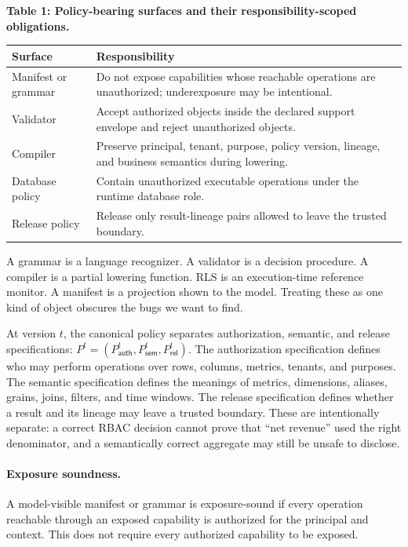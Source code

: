 \begin{center}
\begin{minipage}{\columnwidth}
\centering
\footnotesize
\renewcommand{\arraystretch}{0.96}
\textbf{Table 1: Policy-bearing surfaces and their responsibility-scoped obligations.}\\[2pt]
\begin{tabular}{@{}L{0.30\columnwidth}L{0.60\columnwidth}@{}}
\toprule
Surface & Responsibility \\
\midrule
Manifest or grammar & Do not expose capabilities whose reachable operations are unauthorized; underexposure may be intentional. \\
Validator & Accept authorized objects inside the declared support envelope and reject unauthorized objects. \\
Compiler & Preserve principal, tenant, purpose, policy version, lineage, and business semantics during lowering. \\
Database policy & Contain unauthorized executable operations under the runtime database role. \\
Release policy & Release only result-lineage pairs allowed to leave the trusted boundary. \\
\bottomrule
\end{tabular}
\end{minipage}
\end{center}

A grammar is a language recognizer. A validator is a decision procedure. A compiler is a partial lowering function. RLS is an execution-time reference monitor. A manifest is a projection shown to the model. Treating these as one kind of object obscures the bugs we want to find.

At version $t$, the canonical policy separates authorization, semantic, and release specifications: $P^t=(P_{\mathsf{auth}}^t,P_{\mathsf{sem}}^t,P_{\mathsf{rel}}^t)$. The authorization specification defines who may perform operations over rows, columns, metrics, tenants, and purposes. The semantic specification defines the meanings of metrics, dimensions, aliases, grains, joins, filters, and time windows. The release specification defines whether a result and its lineage may leave a trusted boundary. These are intentionally separate: a correct RBAC decision cannot prove that ``net revenue'' used the right denominator, and a semantically correct aggregate may still be unsafe to disclose.

\paragraph{Exposure soundness.}
A model-visible manifest or grammar is exposure-sound if every operation reachable through an exposed capability is authorized for the principal and context. This does not require every authorized capability to be exposed.

